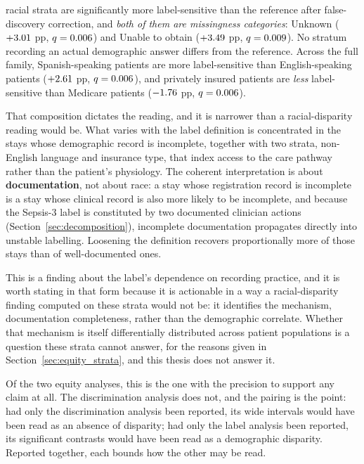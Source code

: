 \pcLabelSensNSigRace{} racial strata are significantly more label-sensitive
than the reference after false-discovery correction, and \emph{both of them are
missingness categories}: Unknown ($+3.01$ pp,
$q = 0.006$) and Unable to obtain ($+3.49$ pp,
$q = 0.009$). No stratum recording an actual demographic answer
differs from the reference. Across the full family, Spanish-speaking patients
are more label-sensitive than English-speaking patients
($+2.61$ pp, $q = 0.006$), and privately
insured patients are \emph{less} label-sensitive than Medicare patients
($-1.76$ pp, $q = 0.006$).

That composition dictates the reading, and it is narrower than a
racial-disparity reading would be. What varies with the label definition is
concentrated in the stays whose demographic record is incomplete, together with
two strata, non-English language and insurance type, that index access to
the care pathway rather than the patient's physiology. The coherent
interpretation is about \textbf{documentation}, not about race: a stay whose
registration record is incomplete is a stay whose clinical record is also more
likely to be incomplete, and because the Sepsis-3 label is constituted by two
documented clinician actions (Section~\ref{sec:decomposition}), incomplete
documentation propagates directly into unstable labelling. Loosening the
definition recovers proportionally more of those stays than of well-documented
ones.

This is a finding about the label's dependence on recording practice, and it is
worth stating in that form because it is actionable in a way a racial-disparity
finding computed on these strata would not be: it identifies the mechanism, documentation completeness, rather than the demographic correlate. Whether
that mechanism is itself differentially distributed across patient populations
is a question these strata cannot answer, for the reasons given in
Section~\ref{sec:equity_strata}, and this thesis does not answer it.

Of the two equity analyses, this is the one with the precision to support any
claim at all. The discrimination analysis does not, and the pairing is the
point: had only the discrimination analysis been reported, its wide intervals
would have been read as an absence of disparity; had only the label analysis
been reported, its significant contrasts would have been read as a demographic
disparity. Reported together, each bounds how the other may be read.

